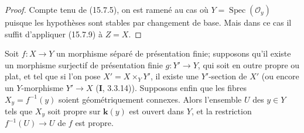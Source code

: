 \begin{proof}
Compte tenu de (15.7.5), on est ramené au cas où $Y=\operatorname{Spec}(\mathcal O_y)$ puisque les hypothèses sont stables par changement de base. Mais dans ce cas il suffit d'appliquer (15.7.9) à $Z=X$.
\end{proof}

\begin{corollary}[15.7.11]
\label{IV.15.7.11-fr}
Soit $f:X\to Y$ un morphisme séparé de présentation finie; supposons qu'il existe un morphisme surjectif de présentation finie $g:Y'\to Y$, qui soit en outre propre \textup{ou} plat, et tel que si l'on pose $X'=X\times_Y Y'$, il existe une $Y'$-section de $X'$ (ou encore un $Y$-morphisme $Y'\to X$ \textup{(\textbf{I}, 3.3.14)}). Supposons enfin que les fibres $X_y=f^{-1}(y)$ soient géométriquement connexes. Alors l'ensemble $U$ des $y\in Y$ tels que $X_y$ soit propre sur $\boldsymbol{k}(y)$ est ouvert dans $Y$, et la restriction $f^{-1}(U)\to U$ de $f$ est propre.
\end{corollary}

